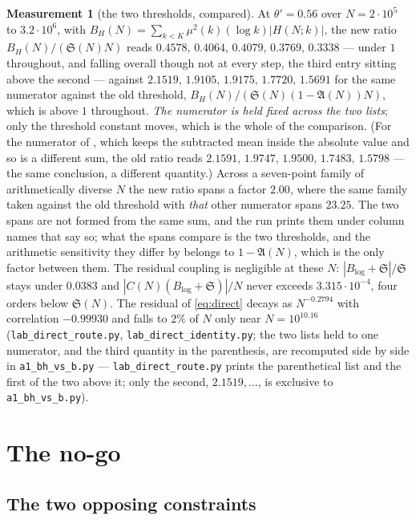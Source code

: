 \documentclass[11pt,a4paper]{article}
\theoremstyle{plain}
\theoremstyle{definition}
\newtheorem{measurement}[theorem]{Measurement}
\theoremstyle{remark}
\renewcommand{\SS}{\mathfrak{S}}
\newcommand{\AAA}{\mathfrak{A}}
\begin{document}
\begin{measurement}[the two thresholds, compared]\label{meas:direct}
At $\theta'=0.56$ over $N=2\cdot10^5$ to $3.2\cdot10^6$, with
$B_H(N)=\sum_{k<K}\mu^2(k)(\log k)|H(N;k)|$, the new ratio
$B_H(N)/(\SS(N)N)$ reads
$0.4578,\,0.4064,\,0.4079,\,0.3769,\,0.3338$ --- under $1$ throughout,
and falling overall though not at every step, the third entry sitting
above the second --- against
$2.1519,\,1.9105,\,1.9175,\,1.7720,\,1.5691$ for the same numerator
against the old threshold, $B_H(N)/(\SS(N)(1-\AAA(N))N)$, which is
above $1$ throughout. \emph{The numerator is held fixed across the two
lists}; only the threshold constant moves, which is the whole of the
comparison. (For the numerator of \cite[the constant-factor inequality]{P1}, which keeps the
subtracted mean inside the absolute value and so is a different sum,
the old ratio reads $2.1591,\,1.9747,\,1.9500,\,1.7483,\,1.5798$ ---
the same conclusion, a different quantity.) Across a
seven-point family of arithmetically diverse $N$ the new ratio spans a
factor $2.00$, where the same family taken against the old threshold
with \emph{that} other numerator spans $23.25$. The two spans are not
formed from the same sum, and the run prints them under column names
that say so; what the spans compare is the two thresholds, and the
arithmetic sensitivity they differ by belongs to $1-\AAA(N)$, which is
the only factor between them. The residual coupling is
negligible at these $N$: $|B_{\log}+\SS|/\SS$ stays under $0.0383$ and
$|C(N)(B_{\log}+\SS)|/N$ never exceeds $3.315\cdot10^{-4}$, four
orders below $\SS(N)$. The residual of \eqref{eq:direct} decays as
$N^{-0.2794}$ with correlation $-0.99930$ and falls to $2\%$ of $N$
only near $N=10^{10.16}$
(\texttt{lab\_direct\_route.py}, \texttt{lab\_direct\_identity.py};
the two lists held to one numerator, and the third quantity in the
parenthesis, are recomputed side by side in
\texttt{a1\_bh\_vs\_b.py} --- \texttt{lab\_direct\_route.py} prints
the parenthetical list and the first of the two above it; only the
second, $2.1519,\dots$, is exclusive to \texttt{a1\_bh\_vs\_b.py}).
\end{measurement}

\section{The no-go}\label{sec:nogo}

\subsection{The two opposing constraints}
\end{document}
